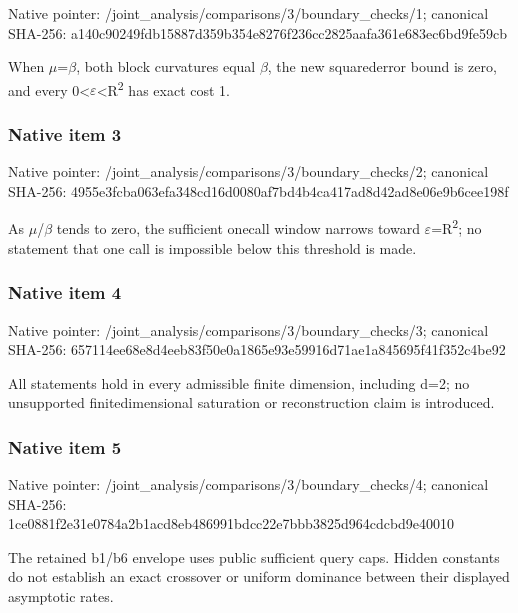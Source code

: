 \documentclass[10pt,a4paper]{article}
\begin{document}
Native pointer: /joint\_analysis/comparis\allowbreak{}ons/3/boundary\_checks/1; canonical SHA-256: a140c90249fdb15887d359b3\allowbreak{}54e8276f236cc2825aafa361\allowbreak{}e683ec6bd9fe59cb


When \ensuremath{\mu}=\ensuremath{\beta}, both block curvatures equal \ensuremath{\beta}, the new squarederror bound is zero, and every 0<\ensuremath{\varepsilon}<R\textsuperscript{2} has exact cost 1.


\subsubsection{Native item 3}


Native pointer: /joint\_analysis/comparis\allowbreak{}ons/3/boundary\_checks/2; canonical SHA-256: 4955e3fcba063efa348cd16d\allowbreak{}0080af7bd4b4ca417ad8d42a\allowbreak{}d8e06e9b6cee198f


As \ensuremath{\mu}/\ensuremath{\beta} tends to zero, the sufficient onecall window narrows toward \ensuremath{\varepsilon}=R\textsuperscript{2}; no statement that one call is impossible below this threshold is made.


\subsubsection{Native item 4}


Native pointer: /joint\_analysis/comparis\allowbreak{}ons/3/boundary\_checks/3; canonical SHA-256: 657114ee68e8d4eeb83f50e0\allowbreak{}a1865e93e59916d71ae1a845\allowbreak{}695f41f352c4be92


All statements hold in every admissible finite dimension, including d=2; no unsupported finitedimensional saturation or reconstruction claim is introduced.


\subsubsection{Native item 5}


Native pointer: /joint\_analysis/comparis\allowbreak{}ons/3/boundary\_checks/4; canonical SHA-256: 1ce0881f2e31e0784a2b1acd\allowbreak{}8eb486991bdcc22e7bbb3825\allowbreak{}d964cdcbd9e40010


The retained b1/b6 envelope uses public sufficient query caps. Hidden constants do not establish an exact crossover or uniform dominance between their displayed asymptotic rates.
\end{document}
